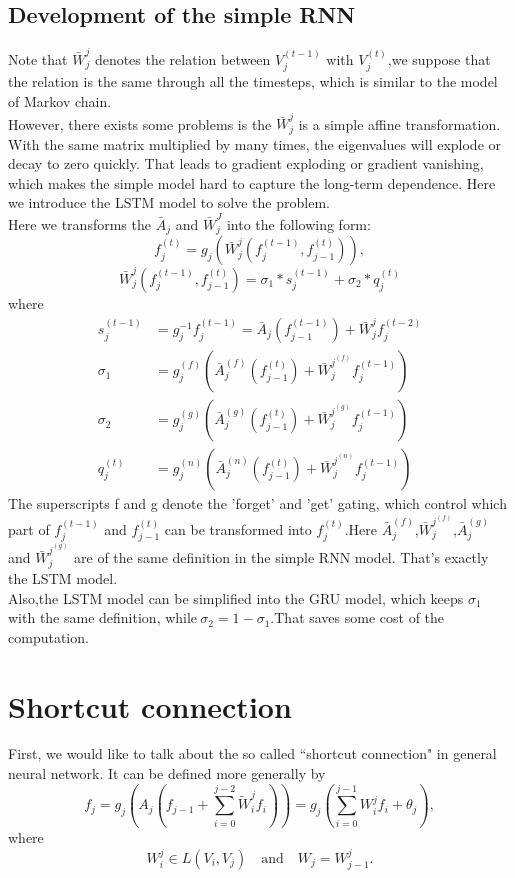 \subsection{Development of the simple RNN}
Note that $\bar{W}_j^j$ denotes the relation between $V_j^{(t-1)}$ with $V_j^{(t)}$,we suppose that the relation is the same through all the timesteps, which is similar to the model of Markov chain. \\
However, there exists some problems is the $\bar{W}_j^j$ is a simple affine transformation. With the same matrix multiplied by many times, the eigenvalues will explode or decay to zero quickly. That leads to gradient exploding or gradient vanishing, which makes the simple model hard to capture the long-term dependence. Here we introduce the LSTM model to solve the problem. \\
Here we transforms the $\bar{A}_j$ and $\bar{W}_j^J$ into the following form:
\begin{equation}
f^{(t)}_j = g_j (\bar{W}_{j}^j (f^{(t-1)}_{j},f^{(t)}_{j-1})),
\end{equation}
\begin{equation}
\bar{W}_{j}^j (f^{(t-1)}_{j},f^{(t)}_{j-1}) = \sigma_1 \ast s_j^{(t-1)} + \sigma_2 \ast q_j^{(t)}
\end{equation}
where
\begin{align}
s_j^{(t-1)} & = g_j^{-1} f_j^{(t-1)} = \bar{A}_j(f^{(t-1)}_{j-1}) + \bar{W}_{j}^{j} f^{(t-2)}_{j} \\
\sigma_1 & = g_j^{(f)}(\bar{A}_j^{(f)}(f^{(t)}_{j-1}) + \bar{W}_{j}^{j^{(f)}} f^{(t-1)}_{j}) \\
\sigma_2 & = g_j^{(g)}(\bar{A}_j^{(g)}(f^{(t)}_{j-1}) + \bar{W}_{j}^{j^{(g)}} f^{(t-1)}_{j}) \\
q_j^{(t)} & = g_j^{(n)}(\bar{A}_j^{(n)}(f^{(t)}_{j-1}) + \bar{W}_{j}^{j^{(n)}} f^{(t-1)}_{j})
\end{align}
The superscripts f and g denote the 'forget' and 'get' gating, which control which part of $f_j^{(t-1)}$ and $f_{j-1}^{(t)}$ can be transformed into $f_j^{(t)}$.Here $\bar{A}_j^{(f)} $,$\bar{W}_{j}^{j^{(f)}}$,$\bar{A}_j^{(g)}$ and $\bar{W}_{j}^{j^{(g)}}$ are of the same definition in the simple RNN model. That's exactly the LSTM model. \\
Also,the LSTM model can be simplified into the GRU model, which keeps $\sigma_1$ with the same definition, while$\ \sigma_2 = 1 - \sigma_1$.That saves some cost of the computation.


\section{Shortcut connection}
First, we would like to talk about the so called ``shortcut connection" in general neural network. It can be defined more generally by
\begin{equation}
f_j = g_j(A_j(f_{j-1} + \sum_{i=0}^{j-2}\tilde{W}_i^j f_i)) = g_j( \sum_{i=0}^{j-1}W_i^{j}f_i + \theta_j),
\end{equation}
where 
\begin{equation}
W_i^j \in  L(V_i, V_j) \quad \text{and} \quad W_j = W_{j-1}^j. 
\end{equation}

